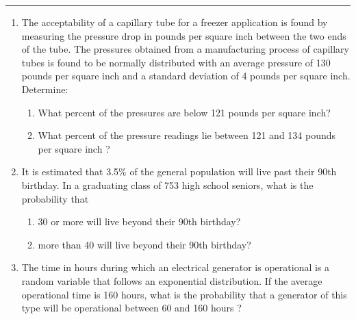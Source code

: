 \documentclass[11pt]{article}
\begin{document}
\Large




\medskip\hrule
\begin{enumerate}

\item The acceptability of a capillary tube for a freezer application is found by measuring the pressure drop in pounds per square inch between the two ends of the tube. The pressures obtained from a manufacturing process of capillary tubes is found to be normally distributed with an average pressure of 130 pounds per square inch and a standard deviation of 4 pounds per square inch. Determine:
\begin{enumerate}
    \item What percent of the pressures are below 121 pounds per square inch?
    \item What percent of the pressure readings lie between 121 and 134 pounds per square inch ?
\end{enumerate}



\newpage


\item It is estimated that 3.5\% of the general population will live past their 90th birthday. In a graduating class of 753 high school seniors, what is the probability that

\begin{enumerate}
    \item 30 or more will live beyond their 90th birthday?
    \item more than 40 will live beyond their 90th birthday?
\end{enumerate}
\newpage
\item The time in hours during which an electrical generator is operational is a random variable that follows an exponential distribution. If the average operational time is 160 hours, what is the probability that a generator of this type will be operational between 60 and 160 hours ?


\end{enumerate}
\end{document}
